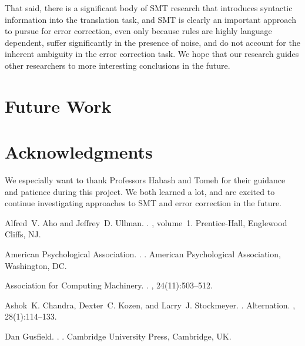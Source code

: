 \documentclass[11pt,letterpaper]{article}
\begin{document}
That said, there is a significant body of SMT research that introduces syntactic information into the translation task, and SMT is clearly an important approach to pursue for error correction, even only because rules are highly language dependent, suffer significantly in the presence of noise, and do not account for the inherent ambiguity in the error correction task. We hope that our research guides other researchers to more interesting conclusions in the future.

\section{Future Work}

\section*{Acknowledgments}

We especially want to thank Professors Habash and Tomeh for their guidance and patience during this project. We both learned a lot, and are excited to continue investigating approaches to SMT and error correction in the future.



\begin{thebibliography}{}

Alfred~V. Aho and Jeffrey~D. Ullman.
.
, volume~1.
\newblock Prentice-{Hall}, Englewood Cliffs, NJ.

{American Psychological Association}.
.
.
\newblock American Psychological Association, Washington, DC.

{Association for Computing Machinery}.
.
, 24(11):503--512.

Ashok~K. Chandra, Dexter~C. Kozen, and Larry~J. Stockmeyer.
.
\newblock Alternation.
,
  28(1):114--133.

Dan Gusfield.
.
.
\newblock Cambridge University Press, Cambridge, UK.

\end{thebibliography}
\end{document}
